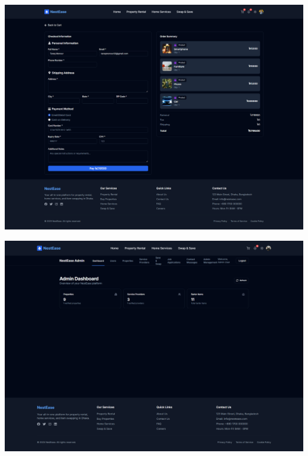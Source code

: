 \documentclass[conference]{IEEEtran}
\begin{document}
\begin{center}
\noindent
\begin{minipage}[t]{0.45\textwidth}
\includegraphics[width=\linewidth]{Project Screenshot/Cart Checkout.png}
\end{minipage}

\begin{minipage}[t]{0.45\textwidth}
\includegraphics[width=\linewidth]{Project Screenshot/Admin Dashboard.png}
\end{minipage}


\end{center}
\end{document}
